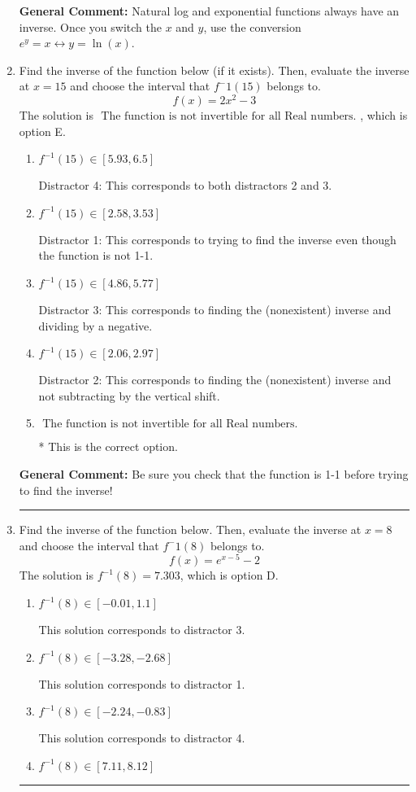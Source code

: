 \documentclass{extbook}[14pt]
\newcommand{\litem}[1]{\item #1

\rule{\textwidth}{0.4pt}}
\begin{document}
\begin{enumerate}
{\textbf{General Comment:} Natural log and exponential functions always have an inverse. Once you switch the $x$ and $y$, use the conversion $ e^y = x \leftrightarrow y=\ln(x)$.
}
\litem{
Find the inverse of the function below (if it exists). Then, evaluate the inverse at $x = 15$ and choose the interval that $f^-1(15)$ belongs to.
\[ f(x) = 2 x^2 - 3 \]The solution is \( \text{ The function is not invertible for all Real numbers. } \), which is option E.\begin{enumerate}[label=\Alph*.]
\item \( f^{-1}(15) \in [5.93, 6.5] \)

 Distractor 4: This corresponds to both distractors 2 and 3.
\item \( f^{-1}(15) \in [2.58, 3.53] \)

 Distractor 1: This corresponds to trying to find the inverse even though the function is not 1-1. 
\item \( f^{-1}(15) \in [4.86, 5.77] \)

 Distractor 3: This corresponds to finding the (nonexistent) inverse and dividing by a negative.
\item \( f^{-1}(15) \in [2.06, 2.97] \)

 Distractor 2: This corresponds to finding the (nonexistent) inverse and not subtracting by the vertical shift.
\item \( \text{ The function is not invertible for all Real numbers. } \)

* This is the correct option.
\end{enumerate}

\textbf{General Comment:} Be sure you check that the function is 1-1 before trying to find the inverse!
}
\litem{
Find the inverse of the function below. Then, evaluate the inverse at $x = 8$ and choose the interval that $f^-1(8)$ belongs to.
\[ f(x) = e^{x-5}-2 \]The solution is \( f^{-1}(8) = 7.303 \), which is option D.\begin{enumerate}[label=\Alph*.]
\item \( f^{-1}(8) \in [-0.01, 1.1] \)

 This solution corresponds to distractor 3.
\item \( f^{-1}(8) \in [-3.28, -2.68] \)

 This solution corresponds to distractor 1.
\item \( f^{-1}(8) \in [-2.24, -0.83] \)

 This solution corresponds to distractor 4.
\item \( f^{-1}(8) \in [7.11, 8.12] \)


\end{enumerate}}
\end{enumerate}
\end{document}
